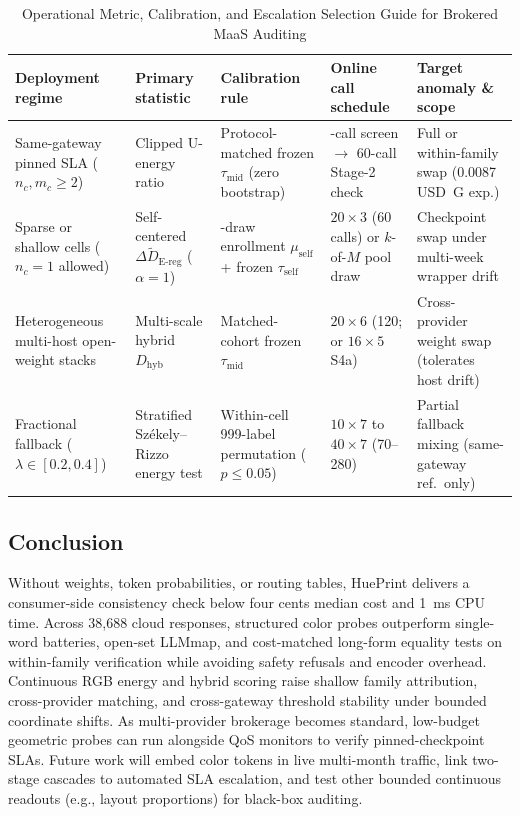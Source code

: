 \documentclass[10pt,journal,compsoc]{IEEEtran}
\newcommand{\Dereg}{\tilde D_{\mathrm{E\mbox{-}reg}}}
\newcommand{\Dhyb}{D_{\mathrm{hyb}}}
\begin{document}
\begin{table}[t]
\centering
\caption{Operational Metric, Calibration, and Escalation Selection Guide for Brokered MaaS Auditing}
\label{tab:deployment_guide}
\footnotesize\setlength{\tabcolsep}{3pt}\renewcommand{\arraystretch}{1.06}
\begin{tabular}{@{}>{\raggedright\arraybackslash}p{}>{\raggedright\arraybackslash}p{}>{\raggedright\arraybackslash}p{}>{\raggedright\arraybackslash}p{}>{\raggedright\arraybackslash}p{}@{}}
\toprule
Deployment regime & Primary statistic & Calibration rule & Online call schedule & Target anomaly \& scope \\
\midrule
Same-gateway pinned SLA ($n_c, m_c \ge 2$) & Clipped U-energy ratio & Protocol-matched frozen $\tau_{\mathrm{mid}}$ (zero bootstrap) & 30-call screen $\rightarrow$ 60-call Stage-2 check & Full or within-family swap (0.0087 USD~G exp.) \\
Sparse or shallow cells ($n_c = 1$ allowed) & Self-centered $\Delta\Dereg{}$ ($\alpha = 1$) & 256-draw enrollment $\mu_{\mathrm{self}}$ + frozen $\tau_{\mathrm{self}}$ & $20\times 3$ (60 calls) or $k$-of-$M$ pool draw & Checkpoint swap under multi-week wrapper drift \\
Heterogeneous multi-host open-weight stacks & Multi-scale hybrid $\Dhyb{}$ & Matched-cohort frozen $\tau_{\mathrm{mid}}$ & $20\times 6$ (120; or $16\times 5$ S4a) & Cross-provider weight swap (tolerates host drift) \\
Fractional fallback ($\lambda \in [0.2, 0.4]$) & Stratified Sz\'ekely--Rizzo energy test & Within-cell 999-label permutation ($p \le 0.05$) & $10\times 7$ to $40\times 7$ (70--280) & Partial fallback mixing (same-gateway ref.\ only) \\
\bottomrule
\end{tabular}
\end{table}

\subsection{Conclusion}
Without weights, token probabilities, or routing tables, HuePrint delivers a consumer-side consistency check below four cents median cost and 1~ms CPU time. Across 38,688 cloud responses, structured color probes outperform single-word batteries, open-set LLMmap, and cost-matched long-form equality tests on within-family verification while avoiding safety refusals and encoder overhead. Continuous RGB energy and hybrid scoring raise shallow family attribution, cross-provider matching, and cross-gateway threshold stability under bounded coordinate shifts. As multi-provider brokerage becomes standard, low-budget geometric probes can run alongside QoS monitors to verify pinned-checkpoint SLAs. Future work will embed color tokens in live multi-month traffic, link two-stage cascades to automated SLA escalation, and test other bounded continuous readouts (e.g., layout proportions) for black-box auditing.
\end{document}
